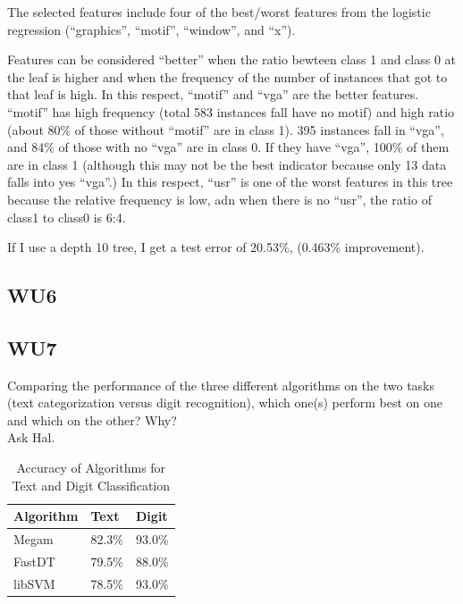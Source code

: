 \documentclass[a4paper,11pt]{article}
\begin{document}
The selected features include four of the best/worst features from
the logistic regression (``graphics'', ``motif'', ``window'', and ``x'').

Features can be considered ``better'' when the ratio bewteen class 1
and class 0 at the leaf is higher and when the frequency of the number
of instances that got to that leaf is high. In this respect, ``motif''
and ``vga'' are the better features. ``motif'' has high frequency
(total 583 instances fall have no motif) and high ratio (about 80\% of
those without ``motif'' are in class 1).  395 instances fall in
``vga'', and 84\% of those with no ``vga'' are in class 0. If they
have ``vga'', 100\% of them are in class 1 (although this may not be the
best indicator because only 13 data falls into yes ``vga''.) 
In this respect, ``usr'' is one of the worst features in this tree
because the relative frequency is low, adn when there is no ``usr'',
the ratio of class1 to class0 is 6:4.

If I use a depth 10 tree, I get a test error of 20.53\%, (0.463\%
improvement).

\subsection{WU6}
\textsf{}

\subsection{WU7}
\textsf{Comparing the performance of the three different algorithms 
on the two tasks (text categorization versus digit recognition), 
which one(s) perform best on one and which on the other? Why?}\\

Ask Hal.

\begin{table}
\begin{center}
    \caption{Accuracy of Algorithms for Text and Digit Classification}
    \begin{tabular}{ | l | l | l |} \hline
    Algorithm & Text   & Digit \\ \hline
    Megam     & 82.3\% & 93.0\% \\ \hline
    FastDT    & 79.5\% & 88.0\% \\ \hline
    libSVM    & 78.5\% & 93.0\% \\ \hline
    \end{tabular}
\end{center}
\end{table}
\end{document}
